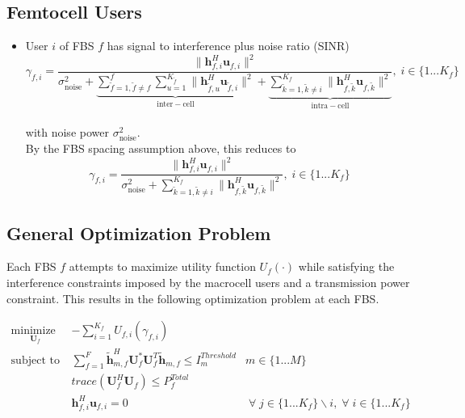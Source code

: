\subsection{Femtocell Users}
\begin{itemize}

\item User $i$ of FBS $f$ has signal to interference plus noise ratio (SINR)
	\begin{equation*}
	\gamma_{f,i} = \frac{\|\mathbf{h}^H_{f,i}\mathbf{u}_{f,i}\|^2}
	{\sigma^2_{\text{noise}}   +
	\underbrace{
	 \sum_{\tilde{f}=1, \tilde{f}\neq f}^{f} \sum_{u=1}^{K_{\tilde{f}}}
	\|\mathbf{h}^H_{\tilde{f},u}\mathbf{u}_{\tilde{f},i}\|^2}_{\mathrm{inter-cell}}
	 + 
	 \underbrace{
	 \sum_{\tilde{k}=1, \tilde{k}\neq i}^{K_f}
	 \|\mathbf{h}^H_{f,\tilde{k}}\mathbf{u}_{f,\tilde{k}}\|^2}_{\mathrm{intra-cell}}},
	  \; i \in \{1 ... K_f\}
	  \end{equation*}
\\
with noise power $\sigma^2_{\text{noise}}.$
\\

By the FBS spacing assumption above, this reduces to
	\begin{equation*}
	\gamma_{f,i} = \frac{\|\mathbf{h}^H_{f,i}\mathbf{u}_{f,i}\|^2}
	{\sigma^2_{\text{noise}} 
	 + \sum_{\tilde{k}=1, \tilde{k}\neq i}^{K_f}
	  \|\mathbf{h}^H_{f,\tilde{k}}\mathbf{u}_{f,\tilde{k}}\|^2},
	  \; i \in \{1 ... K_f\}
	\end{equation*}

\end{itemize}





\subsection{General Optimization Problem}\label{genproblem}

Each FBS $f$ attempts to maximize utility function $U_{f}(\cdot)$ while satisfying the interference constraints imposed by the macrocell users and a transmission power constraint. This results in the following optimization problem at each FBS.
\par

	\begin{subequations}
	\label{optim}
	\begin{align}
	    \underset{\mathbf{U}_{f} }{\text{minimize  }} \;
	    & - \sum_{i=1}^{K_f}
    	U_{f,i}(\gamma_{f,i}) \label{player_opt} \\
	    \text{subject to  } \; &
	   \sum^F_{f=1} \tilde{\mathbf{h}}_{m,f}^H  \mathbf{U}_{f}^*		
	\mathbf{U}_{f}^{T} \tilde{\mathbf{h}}_{m,f} \leq I^{Threshold}		
	_{m} & m \in \{1 ...M\} 
		\label{interference_const_gen}\\
        & trace(\mathbf{U}_{f}^H\mathbf{U}_{f}) \leq P^{Total}_{f} \label{power_const_gen}\\
        & \mathbf{h}_{f,i}^H\mathbf{u}_{f,i} =0\ & \; \forall \; j \in \{1... K_{f}\}\backslash i,\; \forall \; i\in \{1 ... K_{f}\} \label{zf_const_gen}
	\end{align}
	\end{subequations}


